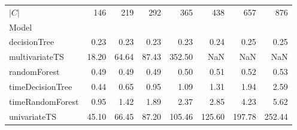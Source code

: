 \begin{tabular}{lrrrrrrr}
\toprule
$|C|$ & 146 & 219 & 292 & 365 & 438 & 657 & 876 \\
Model &  &  &  &  &  &  &  \\
\midrule
decisionTree & 0.23 & 0.23 & 0.23 & 0.23 & 0.24 & 0.25 & 0.25 \\
multivariateTS & 18.20 & 64.64 & 87.43 & 352.50 & NaN & NaN & NaN \\
randomForest & 0.49 & 0.49 & 0.49 & 0.50 & 0.51 & 0.52 & 0.53 \\
timeDecisionTree & 0.44 & 0.65 & 0.95 & 1.09 & 1.31 & 1.94 & 2.59 \\
timeRandomForest & 0.95 & 1.42 & 1.89 & 2.37 & 2.85 & 4.23 & 5.62 \\
univariateTS & 45.10 & 66.45 & 87.20 & 105.46 & 125.60 & 197.78 & 252.44 \\
\bottomrule
\end{tabular}
